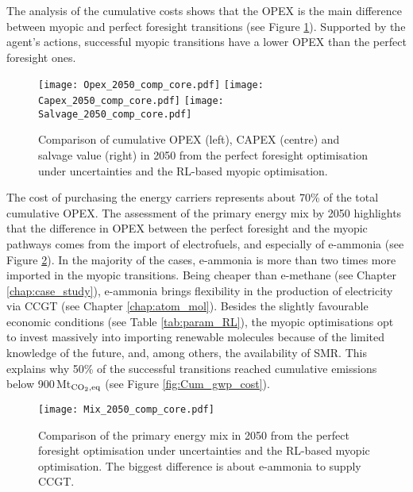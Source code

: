 \documentclass[12pt,letterpaper]{article}
\begin{document}
The analysis of the cumulative costs shows that the \gls*{OPEX} is the main difference between myopic and perfect foresight transitions (see Figure \ref{fig:Opex_Capex_Salvage_comp}). Supported by the agent's actions, successful myopic transitions have a lower \gls*{OPEX} than the perfect foresight ones.

\begin{figure}[!htbp]
\centering
\texttt{[image: Opex\_2050\_comp\_core.pdf]}
\texttt{[image: Capex\_2050\_comp\_core.pdf]}
\texttt{[image: Salvage\_2050\_comp\_core.pdf]}
\caption{Comparison of cumulative OPEX (left), CAPEX (centre) and salvage value (right) in 2050 from the perfect foresight optimisation under uncertainties and the \gls*{RL}-based myopic optimisation.}
\label{fig:Opex_Capex_Salvage_comp}
\end{figure}

The cost of purchasing the energy carriers represents about 70\% of the total cumulative \gls*{OPEX}. The assessment of the primary energy mix by 2050 highlights that the difference in OPEX between the perfect foresight and the myopic pathways comes from the import of electrofuels, and especially of e-ammonia (see Figure \ref{fig:Mix_2050_comp}).  In the majority of the cases, e-ammonia is more than two times more imported in the myopic transitions. Being cheaper than e-methane (see Chapter \ref{chap:case_study}), e-ammonia brings flexibility in the production of electricity via \gls*{CCGT} (see Chapter \ref{chap:atom_mol}). Besides the slightly favourable economic conditions (see Table \ref{tab:param_RL}), the myopic optimisations opt to invest massively into importing renewable molecules because of the limited knowledge of the future, and, among others, the availability of \gls*{SMR}. This explains why 50\% of the successful transitions reached cumulative emissions below 900\,Mt$_{\ce{CO2},\text{eq}}$ (see Figure \ref{fig:Cum_gwp_cost}).

\begin{figure}[!htbp]
\centering
\texttt{[image: Mix\_2050\_comp\_core.pdf]}
\caption{Comparison of the primary energy mix in 2050 from the perfect foresight optimisation under uncertainties and the \gls*{RL}-based myopic optimisation. The biggest difference is about e-ammonia to supply \gls*{CCGT}.}
\label{fig:Mix_2050_comp}
\end{figure}

\newpage
\end{document}
